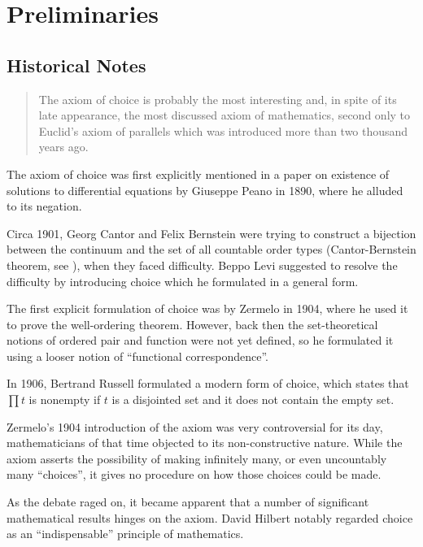 \chapter{Preliminaries}
\section{Historical Notes}

\begin{quote}
    The axiom of choice is probably the most interesting and, in spite of its late appearance, the most discussed axiom of mathematics,
    second only to Euclid's axiom of parallels which was introduced more than two thousand years ago. \autocite{fraenkel1973}
\end{quote}
The axiom of choice was first explicitly mentioned in a paper on existence of solutions to differential equations by Giuseppe Peano in 1890,
where he alluded to its negation.

Circa 1901, Georg Cantor and Felix Bernstein were trying to construct a bijection between the continuum and the set of all countable order types (Cantor-Bernstein theorem, see \autocite[3]{hausdorff2005}), when they faced difficulty. Beppo Levi suggested to resolve the difficulty by introducing choice which he formulated in a general form.

The first explicit formulation of choice was by Zermelo in 1904, where he used it to prove the well-ordering theorem.
However, back then the set-theoretical notions of ordered pair and function were not yet defined, so he formulated it using a looser notion of ``functional correspondence''.

In 1906, Bertrand Russell formulated a modern form of choice, which states that \(\prod t\) is nonempty if \(t\) is a disjointed set and it does not contain the empty set.


Zermelo's 1904 introduction of the axiom was very controversial for its day, mathematicians of that time objected to its non-constructive nature.
While the axiom asserts the possibility of making infinitely many, or even uncountably many ``choices'', it gives no procedure on how those choices could be made.

As the debate raged on, it became apparent that a number of significant mathematical results hinges on the axiom.
David Hilbert notably regarded choice as an ``indispensable'' principle of mathematics.

